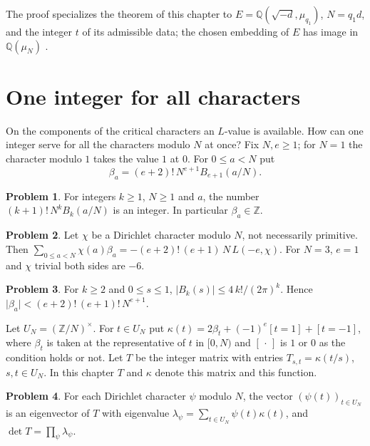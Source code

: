 \documentclass[reqno]{amsart}
\newcounter{chap}
\theoremstyle{definition}
\newtheorem{problem}{Problem}[section]
\theoremstyle{plain}
\newcommand{\Z}{\mathbb{Z}}
\newcommand{\Q}{\mathbb{Q}}
\begin{document}
The proof specializes the theorem of this chapter to \(E=\Q(\sqrt{-d},\mu_{q_1})\), \(N=q_1d\), and the integer \(t\) of its admissible data; the chosen embedding of \(E\) has image in \(\Q(\mu_N)\) \cite{GL}.

\section{One integer for all characters}\label{sec:bernoulli}

On the components of the critical characters an \(L\)-value is available.  How can one integer serve for all the characters modulo \(N\) at once?  Fix \(N,e\ge1\); for \(N=1\) the character modulo \(1\) takes the value \(1\) at \(0\).  For \(0\le a<N\) put
\[
 \beta_a=(e+2)!\,N^{e+1}B_{e+1}(a/N).
\]

\begin{problem}\label{pr:integral}
For integers \(k\ge1\), \(N\ge1\) and \(a\), the number \((k+1)!\,N^kB_k(a/N)\) is an integer.  In particular \(\beta_a\in\Z\).
\end{problem}

\begin{problem}\label{pr:hurwitz}
Let \(\chi\) be a Dirichlet character modulo \(N\), not necessarily primitive.  Then \(\sum_{0\le a<N}\chi(a)\beta_a=-(e+2)!\,(e+1)\,N\,L(-e,\chi)\).  For \(N=3\), \(e=1\) and \(\chi\) trivial both sides are \(-6\).
\end{problem}

\begin{problem}\label{pr:size}
For \(k\ge2\) and \(0\le s\le1\), \(\lvert B_k(s)\rvert\le4\,k!/(2\pi)^k\).  Hence \(\lvert\beta_a\rvert<(e+2)!\,(e+1)!\,N^{e+1}\).
\end{problem}

Let \(U_N=(\Z/N)^\times\).  For \(t\in U_N\) put \(\kappa(t)=2\beta_t+(-1)^e[t=1]+[t=-1]\), where \(\beta_t\) is taken at the representative of \(t\) in \([0,N)\) and \([\,\cdot\,]\) is \(1\) or \(0\) as the condition holds or not.  Let \(T\) be the integer matrix with entries \(T_{s,t}=\kappa(t/s)\), \(s,t\in U_N\).  In this chapter \(T\) and \(\kappa\) denote this matrix and this function.

\begin{problem}\label{pr:matrix}
For each Dirichlet character \(\psi\) modulo \(N\), the vector \((\psi(t))_{t\in U_N}\) is an eigenvector of \(T\) with eigenvalue \(\lambda_\psi=\sum_{t\in U_N}\psi(t)\kappa(t)\), and \(\det T=\prod_\psi\lambda_\psi\).
\end{problem}
\end{document}
